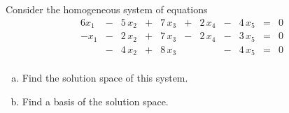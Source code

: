 
\begin{exerciseStatement}


Consider the homogeneous system of equations 
\begin{alignat*}{6} x_{1} &-& 5 \, x_{2} &+& 7 \, x_{3} &+& 2 \, x_{4} &-& 4 \, x_{5} &=& 0 \\-x_{1} &-& 2 \, x_{2} &+& 7 \, x_{3} &-& 2 \, x_{4} &-& 3 \, x_{5} &=& 0 \\ &-& 4 \, x_{2} &+& 8 \, x_{3} & &  &-& 4 \, x_{5} &=& 0 \\ \end{alignat*}
            


\begin{enumerate}[(a)]
\item  Find the solution space of this system.
\item  Find a basis of the solution space.
\end{enumerate}
    
\end{exerciseStatement}
    

